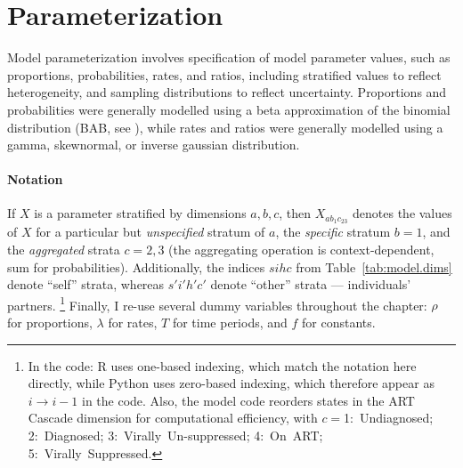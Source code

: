 \section{Parameterization}\label{model.par}
Model parameterization involves
specification of model parameter values, such as proportions, probabilities, rates, and ratios,
including stratified values to reflect heterogeneity,
and sampling distributions to reflect uncertainty.
Proportions and probabilities were generally modelled using
a beta approximation of the binomial distribution (BAB, see ),
while rates and ratios were generally modelled using
a gamma, skewnormal, or inverse gaussian distribution.
\paragraph{Notation}
If $X$ is a parameter stratified by dimensions $a,b,c$,
then $X_{ab_{1}c_{23}}$ denotes the values of $X$ for
a particular but \emph{unspecified} stratum of $a$,
the \emph{specific} stratum $b = 1$,
and the \emph{aggregated} strata $c = 2,3$
(the aggregating operation is context-dependent, \eg sum for probabilities).
Additionally, the indices $sihc$ from Table~\ref{tab:model.dims} denote ``self'' strata,
whereas $s'i'h'c'$ denote ``other'' strata --- \ie individuals' partners.%
\footnote{\label{foot:code.note}%
  In the code: R uses one-based indexing, which match the notation here directly,
  while Python uses zero-based indexing, which therefore appear as $i \rightarrow i-1$ in the code.
  Also, the model code reorders states in the ART Cascade dimension for computational efficiency,
  with $c={}$1:~Undiagnosed; 2:~Diagnosed; 3:~Virally~Un-suppressed; 4:~On~ART; 5:~Virally~Suppressed.}
Finally, I re-use several dummy variables throughout the chapter:
$\rho$ for proportions, $\lambda$ for rates, $T$ for time periods, and $f$ for constants.




